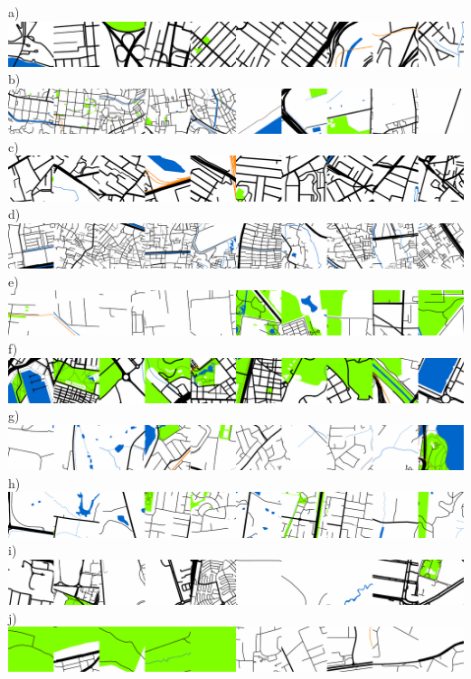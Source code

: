 \documentclass{nature}
\makeatletter
\renewenvironment*{figure}{\@float{figure}}{\end@float}
\makeatother
\begin{document}
\begin{figure}
\centering    
a)\includegraphics[trim={0 0 0 0},clip,scale=0.15]{Images/CaseStudy/MapsNewYorkNewarkUnitedStatesofAmerica.png}   
b)\includegraphics[trim={0 0 0 0},clip,scale=0.15]{Images/CaseStudy/MapsTokyoJapan.png}   
c)\includegraphics[trim={0 0 0 0},clip,scale=0.15]{Images/CaseStudy/MapsParisFrance.png}  
d)\includegraphics[trim={0 0 0 0},clip,scale=0.15]{Images/CaseStudy/MapsJakartaIndonesia.png}  
e)\includegraphics[trim={0 0 0 0},clip,scale=0.15]{Images/CaseStudy/MapsBeijingChina.png}  
f)\includegraphics[trim={0 0 0 0},clip,scale=0.15]{Images/CaseStudy/MapsBarcelonaSpain.png}  
g)\includegraphics[trim={0 0 0 0},clip,scale=0.15]{Images/CaseStudy/MapsSydneyAustralia.png}  
h)\includegraphics[trim={0 0 0 0},clip,scale=0.15]{Images/CaseStudy/MapsMelbourneAustralia.png} 
i)\includegraphics[trim={0 0 0 0},clip,scale=0.15]{Images/CaseStudy/MapsBrasiliaBrazil.png}  
j)\includegraphics[trim={0 0 0 0},clip,scale=0.15]{Images/CaseStudy/MapsNairobiKenya.png}   

  
  
\caption{\bf Maps for top SOM x,y locations for cities a) New York, b) Tokyo, c) Paris, d) Jakarta, e) Beijing, f) Barcelona, g) Sydney, h) Melbourne, i) Bras\'{i}lia, and j) Nairobi.  }    
 \label{fig:kernel}  
\end{figure} 
\end{document}
